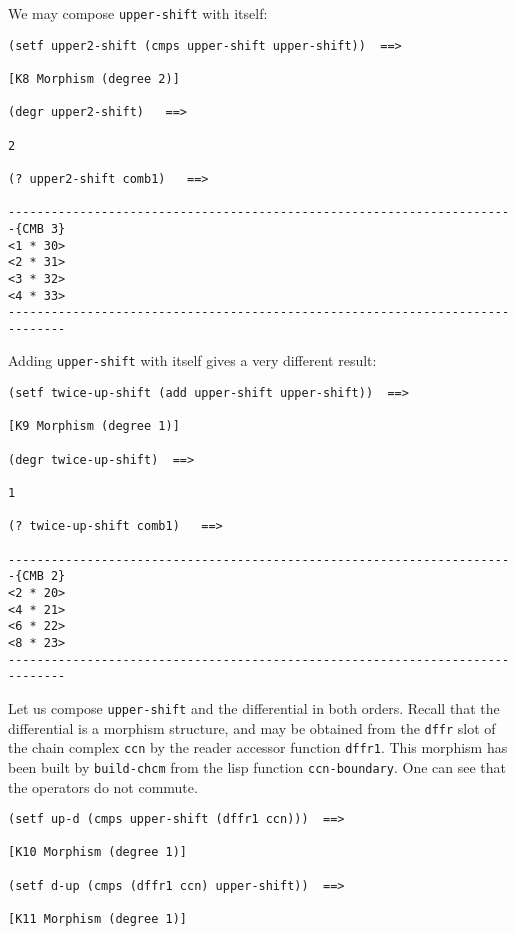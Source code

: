 We may compose {\tt upper-shift} with itself:
{\footnotesize\begin{verbatim}
(setf upper2-shift (cmps upper-shift upper-shift))  ==>

[K8 Morphism (degree 2)]

(degr upper2-shift)   ==>

2

(? upper2-shift comb1)   ==>

-----------------------------------------------------------------------{CMB 3}
<1 * 30>
<2 * 31>
<3 * 32>
<4 * 33>
------------------------------------------------------------------------------
\end{verbatim}}
Adding {\tt upper-shift} with itself gives a very different result:
{\footnotesize\begin{verbatim}
(setf twice-up-shift (add upper-shift upper-shift))  ==>

[K9 Morphism (degree 1)]

(degr twice-up-shift)  ==>

1

(? twice-up-shift comb1)   ==>

-----------------------------------------------------------------------{CMB 2}
<2 * 20>
<4 * 21>
<6 * 22>
<8 * 23>
------------------------------------------------------------------------------
\end{verbatim}}
Let us compose {\tt upper-shift} and the differential in both orders.
Recall that the differential is a morphism structure, and
may be obtained from the {\tt dffr} slot  of the chain complex {\tt ccn}
by the reader accessor function {\tt dffr1}. This morphism has
been built by {\tt build-chcm} from the lisp function {\tt ccn-boundary}. One can
see that the operators do not commute.
{\footnotesize\begin{verbatim}
(setf up-d (cmps upper-shift (dffr1 ccn)))  ==>

[K10 Morphism (degree 1)]

(setf d-up (cmps (dffr1 ccn) upper-shift))  ==>

[K11 Morphism (degree 1)]
\end{verbatim}}
\newpage
